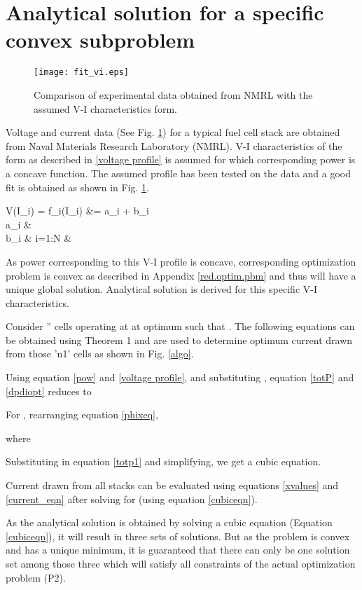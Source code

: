 \documentclass[twocolumn]{autart}
\begin{document}
\section{Analytical solution for a specific convex  subproblem}
\label{anlyt}
\begin{figure}[htbp]
\centering
\texttt{[image: fit\_vi.eps]}
\caption{Comparison of experimental data obtained from NMRL with the assumed V-I characteristics form.}
\label{examplevi}
\vskip-0.2cm
\end{figure}
Voltage and current data (See Fig. \ref{examplevi}) for a typical fuel cell stack are obtained from Naval Materials Research Laboratory (NMRL). V-I characteristics of the form as described in \eqref{voltage profile} is assumed for which corresponding power is a concave function. The assumed profile has been tested on the data and a  good fit is obtained as shown in Fig. \ref{examplevi}.

V(I_i) = f_i(I_i) &= a_i + b_i \  \\
 \quad a_{i} & \\
b_{i} & \qquad \forall \quad i=1:N &

As power corresponding to this V-I profile is concave, corresponding optimization problem is convex as described in Appendix \ref{red.optim.pbm} and thus will have a unique global solution. Analytical solution is derived for this specific V-I characteristics. 

Consider '' cells operating at  at optimum such that . The following equations can be obtained using Theorem 1 and are used to determine optimum current drawn from those 'n1' cells as shown in Fig. \ref{algo}. 


Using equation \eqref{pow} and \eqref{voltage profile}, and substituting , equation \eqref{totP} and \eqref{dpdiopt} reduces to


For , rearranging equation \eqref{phixeq},

where

Substituting in equation \eqref{totp1} and simplifying, we get a cubic equation. 

Current drawn from all stacks can be evaluated using equations \eqref{xvalues} and \eqref{current_eqn} after solving for  (using equation \eqref{cubiceqn}).

As the analytical solution is obtained by solving a cubic equation (Equation \eqref{cubiceqn}), it will result in three sets of solutions. But as the problem is convex and has a unique minimum, it is guaranteed that there can only be one solution set among those three which will satisfy all constraints of the actual optimization problem (P2). 
\end{document}
